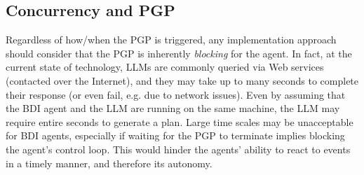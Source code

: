 


\subsection{Concurrency and \ac{PGP}}

Regardless of how/when the \ac{PGP} is triggered,
any implementation approach should consider that the \ac{PGP} is inherently \emph{blocking} for the agent.
%
In fact,
at the current state of technology,
\acp{LLM} are commonly queried via Web services (contacted over the Internet),
and they may take up to many seconds to complete their response
(or even fail, e.g. due to network issues).
%
Even by assuming that the \ac{BDI} agent and the \ac{LLM} are running on the same machine,
the \ac{LLM} may require entire seconds to generate a plan.
%
Large time scales may be unacceptable for \ac{BDI} agents,
especially if waiting for the \ac{PGP} to terminate implies blocking the agent's control loop.
%
This would hinder the agents' ability to react to events in a timely manner,
and therefore its autonomy.

